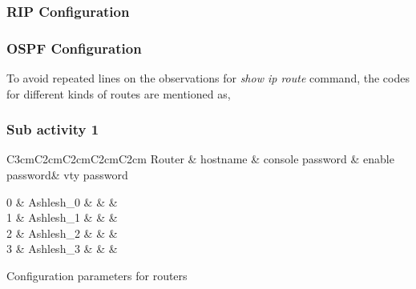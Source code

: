 \documentclass{lab_sheet}
\newcommand{\syntax}[1]{
    
}
\newcommand{\parameter}[1]{
    \begin{tabular}{C{3cm}C{2cm}C{2cm}C{2cm}C{2cm}}
        \toprule
        Router & hostname & console password & enable password& vty password\\
        \midrule
          #1 
          \bottomrule
       \end{tabular}
}
\newcommand{\customcaption}[2]{
    \begin{mdframed}[backgroundcolor=bg,innerbottommargin=-2.5em]
        
          \end{mdframed}
}
\begin{document}
\subsubsection*{RIP Configuration}
\syntax{RIP}
\subsubsection*{OSPF Configuration}
\syntax{OSPF}

To avoid repeated lines on the observations for \textit{show ip route} command, the codes for different kinds of routes are mentioned as,
\customcaption{codes}{Codes for different types of route included in show ip route}

\subsubsection*{Sub activity 1}

\begin{table}[H]
	\centering
	\parameter{
		0 & Ashlesh\_0 &  & \multirow{4}{*}{407} & \multirow{4}{*}{pandey}\\
		1 & Ashlesh\_1 & & & \\
		2 & Ashlesh\_2 & & & \\
		3 & Ashlesh\_3 & & & \\
	}
	\caption{Configuration parameters for routers}
	\label{tbl:parameter}
\end{table}
\end{document}
